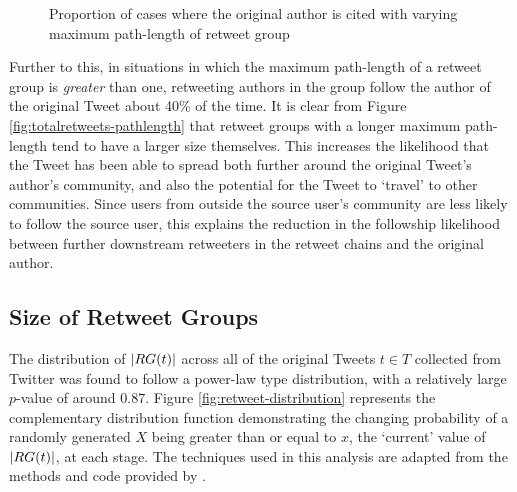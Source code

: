 \begin{figure}[h]
\centering
    \caption{Proportion of cases where the original author is cited with varying maximum path-length of retweet group}
\label{fig:citation-pathlength}
\end{figure}

Further to this, in situations in which the maximum path-length of a retweet group is \textit{greater} than one, retweeting authors in the group follow the author of the original Tweet about 40\% of the time. It is clear from Figure \ref{fig:totalretweets-pathlength} that retweet groups with a longer maximum path-length tend to have a larger size themselves. This increases the likelihood that the Tweet has been able to spread both further around the original Tweet's author's community, and also the potential for the Tweet to `travel' to other communities. Since users from outside the source user's community are less likely to follow the source user, this explains the reduction in the followship likelihood between further downstream retweeters in the retweet chains and the original author.


\subsection{Size of Retweet Groups}
The distribution of $|RG(t)|$ across all of the original Tweets $t \in T$ collected from Twitter was found to follow a power-law type distribution, with a relatively large $p$-value of around $0.87$. Figure \ref{fig:retweet-distribution} represents the complementary distribution function demonstrating the changing probability of a randomly generated $X$ being greater than or equal to $x$, the `current' value of $|RG(t)|$, at each stage. The techniques used in this analysis are adapted from the methods and code provided by \cite{clauset07}.

